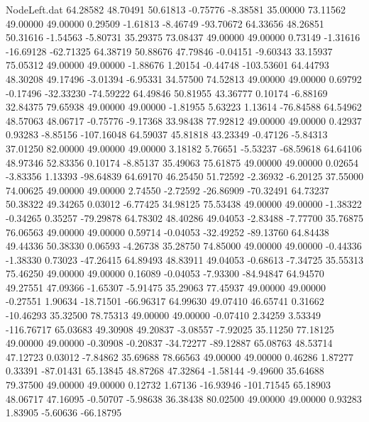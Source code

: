 \begin{filecontents}{NodeLeft.dat}
  64.28582   48.70491   50.61813    -0.75776   -8.38581   35.00000   73.11562   49.00000   49.00000    0.29509   -1.61813   -8.46749  -93.70672
  64.33656   48.26851   50.31616    -1.54563   -5.80731   35.29375   73.08437   49.00000   49.00000    0.73149   -1.31616  -16.69128  -62.71325
  64.38719   50.88676   47.79846    -0.04151   -9.60343   33.15937   75.05312   49.00000   49.00000   -1.88676    1.20154   -0.44748 -103.53601
  64.44793   48.30208   49.17496    -3.01394   -6.95331   34.57500   74.52813   49.00000   49.00000    0.69792   -0.17496  -32.33230  -74.59222
  64.49846   50.81955   43.36777     0.10174   -6.88169   32.84375   79.65938   49.00000   49.00000   -1.81955    5.63223    1.13614  -76.84588
  64.54962   48.57063   48.06717    -0.75776   -9.17368   33.98438   77.92812   49.00000   49.00000    0.42937    0.93283   -8.85156 -107.16048
  64.59037   45.81818   43.23349    -0.47126   -5.84313   37.01250   82.00000   49.00000   49.00000    3.18182    5.76651   -5.53237  -68.59618
  64.64106   48.97346   52.83356     0.10174   -8.85137   35.49063   75.61875   49.00000   49.00000    0.02654   -3.83356    1.13393  -98.64839
  64.69170   46.25450   51.72592    -2.36932   -6.20125   37.55000   74.00625   49.00000   49.00000    2.74550   -2.72592  -26.86909  -70.32491
  64.73237   50.38322   49.34265     0.03012   -6.77425   34.98125   75.53438   49.00000   49.00000   -1.38322   -0.34265    0.35257  -79.29878
  64.78302   48.40286   49.04053    -2.83488   -7.77700   35.76875   76.06563   49.00000   49.00000    0.59714   -0.04053  -32.49252  -89.13760
  64.84438   49.44336   50.38330     0.06593   -4.26738   35.28750   74.85000   49.00000   49.00000   -0.44336   -1.38330    0.73023  -47.26415
  64.89493   48.83911   49.04053    -0.68613   -7.34725   35.55313   75.46250   49.00000   49.00000    0.16089   -0.04053   -7.93300  -84.94847
  64.94570   49.27551   47.09366    -1.65307   -5.91475   35.29063   77.45937   49.00000   49.00000   -0.27551    1.90634  -18.71501  -66.96317
  64.99630   49.07410   46.65741     0.31662  -10.46293   35.32500   78.75313   49.00000   49.00000   -0.07410    2.34259    3.53349 -116.76717
  65.03683   49.30908   49.20837    -3.08557   -7.92025   35.11250   77.18125   49.00000   49.00000   -0.30908   -0.20837  -34.72277  -89.12887
  65.08763   48.53714   47.12723     0.03012   -7.84862   35.69688   78.66563   49.00000   49.00000    0.46286    1.87277    0.33391  -87.01431
  65.13845   48.87268   47.32864    -1.58144   -9.49600   35.64688   79.37500   49.00000   49.00000    0.12732    1.67136  -16.93946 -101.71545
  65.18903   48.06717   47.16095    -0.50707   -5.98638   36.38438   80.02500   49.00000   49.00000    0.93283    1.83905   -5.60636  -66.18795

\end{filecontents}
